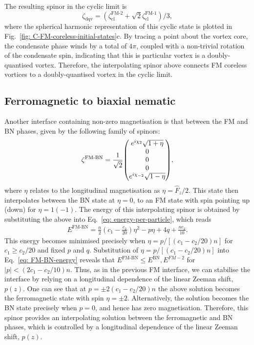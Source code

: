 The resulting spinor in the cyclic limit is
\begin{equation}\label{eq: C-FM-DQV-cyclic-limit}
    \zeta_\text{dqv}
    = \left(\zeta^\text{FM-2}_\text{cl}
    + \sqrt{2}\zeta^\text{FM-1}_\text{cl}\right) / 3,
\end{equation}
where the spherical harmonic representation of this cyclic state is plotted in
Fig.~\ref{fig: C-FM-coreless-initial-states}c.
By tracing a point about the vortex core, the condensate phase winds by a total
of \(4\pi \), coupled with a non-trivial rotation of the condensate spin,
indicating that this is particular vortex is a doubly-quantised vortex.
Therefore, the interpolating spinor above connects FM coreless vortices to a
doubly-quantised vortex in the cyclic limit.

\subsection{Ferromagnetic to biaxial nematic}
Another interface containing non-zero magnetisation is that between the FM and
BN phases, given by the following family of spinors:
\begin{align}\label{eq: FM-BN-interpolating-spinor}
    \zeta^\text{FM-BN} = \frac{1}{\sqrt{2}}\mqty(
    e^{i\chi_2} \sqrt{1 + \eta} \\
    0 \\
    0 \\
    0 \\
    e^{i\chi_{-2}} \sqrt{1 - \eta}),
\end{align}
where \(\eta \) relates to the longitudinal magnetisation as \(\eta =
\hat{F}_z / 2\).
This state then interpolates between the BN state at \(\eta = 0\), to an FM
state with spin pointing up (down) for \(\eta = 1 (-1)\).
The energy of this interpolating spinor is obtained by substituting the above
into Eq.~\eqref{eq: energy-per-particle}, which reads
\begin{align}\label{eq: FM-BN-energy}
    E^\text{FM-BN} = \frac{n}{2}\left(c_1-\frac{c_2}{20}\right)\eta^2
    - p \eta + 4q + \frac{nc_2}{10}.
\end{align}
This energy becomes minimised precisely when \(\eta = p / [(c_1-c_2/20)n]\) for
\(c_1 \geq c_2/20\) and fixed \(p\) and \(q\).
Substitution of \(\eta = p / [(c_1-c_2/20)n]\) into Eq.~\eqref{eq: FM-BN-energy}
reveals that \(E^\text{FM-BN} \leq E^\text{BN},
E^{FM-2}\) for \(|p| < (2c_1-c_2/10)n\).
Thus, as in the previous FM interface, we can stabilise the interface by relying
on a longitudinal dependence of the linear Zeeman shift, \(p(z)\).
One can see that at \(p = \pm 2(c_1-c_2/20)n\) the above solution becomes
the ferromagnetic state with spin \(\eta = \pm 2\).
Alternatively, the solution becomes the BN state precisely when \(p=0\), and
hence has zero magnetisation.
Therefore, this spinor provides an interpolating solution between the
ferromagnetic and BN phases, which is controlled by a longitudinal dependence of
the linear Zeeman shift, \(p(z)\).

